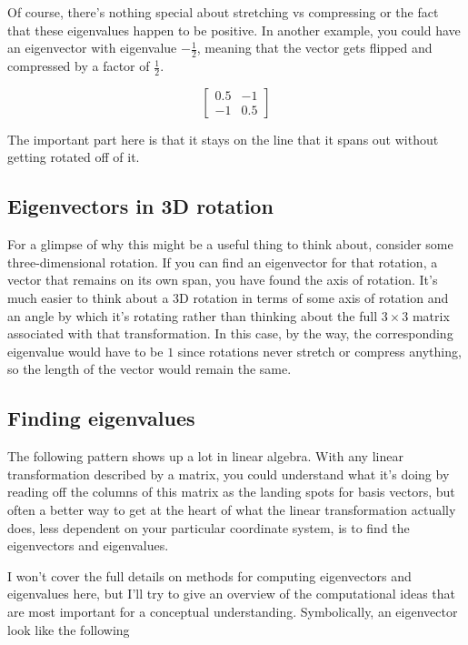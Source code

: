 Of course, there's nothing special about stretching vs compressing or the fact
that these eigenvalues happen to be positive. In another example, you could have
an eigenvector with eigenvalue $-\frac{1}{2}$, meaning that the vector gets
flipped and compressed by a factor of $\frac{1}{2}$.

\begin{equation*}
  \begin{bmatrix}
    0.5 & -1 \\
    -1 & 0.5
  \end{bmatrix}
\end{equation*}

The important part here is that it stays on the line that it spans out without
getting rotated off of it.

\subsection{Eigenvectors in 3D rotation}

For a glimpse of why this might be a useful thing to think about, consider some
three-dimensional rotation. If you can find an eigenvector for that rotation, a
vector that remains on its own span, you have found the axis of rotation. It's
much easier to think about a 3D rotation in terms of some axis of rotation and
an angle by which it's rotating rather than thinking about the full $3 \times 3$
matrix associated with that transformation. In this case, by the way, the
corresponding eigenvalue would have to be $1$ since rotations never stretch or
compress anything, so the length of the vector would remain the same.

\subsection{Finding eigenvalues}

The following pattern shows up a lot in linear algebra. With any linear
transformation described by a matrix, you could understand what it's doing by
reading off the columns of this matrix as the landing spots for basis vectors,
but often a better way to get at the heart of what the linear transformation
actually does, less dependent on your particular coordinate system, is to find
the eigenvectors and eigenvalues.

I won't cover the full details on methods for computing eigenvectors and
eigenvalues here, but I'll try to give an overview of the computational ideas
that are most important for a conceptual understanding. Symbolically, an
eigenvector look like the following

